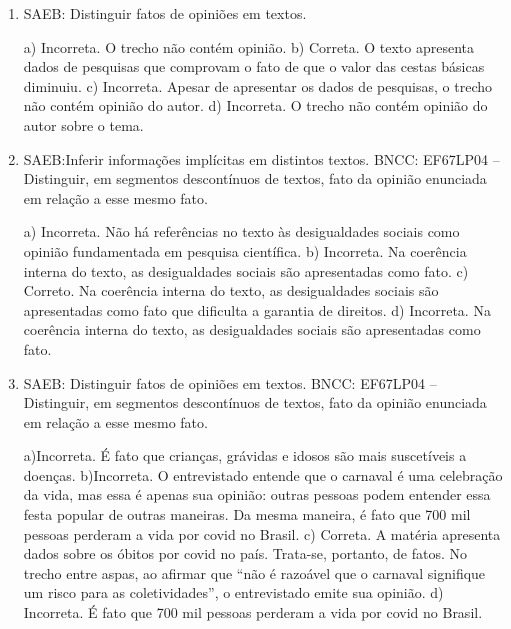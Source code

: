 
\begin{enumerate}

\item
SAEB: Distinguir fatos de opiniões em textos.

a) Incorreta. O trecho não contém opinião. 
b) Correta. O texto apresenta dados de pesquisas que comprovam o fato de
que o valor das cestas básicas diminuiu.
c) Incorreta. Apesar de apresentar os dados de pesquisas, o trecho não
contém opinião do autor.
d) Incorreta. O trecho não contém opinião do autor sobre o tema.

\item
SAEB:Inferir informações implícitas em distintos textos.
BNCC: EF67LP04 -- Distinguir, em segmentos descontínuos de
textos, fato da opinião enunciada em relação a esse mesmo fato.

a) Incorreta. Não há referências no texto às desigualdades sociais como
opinião fundamentada em pesquisa científica.  
b) Incorreta. Na coerência interna do texto, as desigualdades sociais são
apresentadas como fato. 
c) Correto. Na coerência interna do texto, as desigualdades sociais são
apresentadas como fato que dificulta a garantia de direitos.
d) Incorreta. Na coerência interna do texto, as desigualdades sociais são
apresentadas como fato.

\item
SAEB: Distinguir fatos de opiniões em textos.
BNCC: EF67LP04 -- Distinguir, em segmentos descontínuos de textos,
fato da opinião enunciada em relação a esse mesmo fato.

a)Incorreta. É fato que crianças, grávidas e idosos são mais suscetíveis a
doenças. 
b)Incorreta. O entrevistado entende que o carnaval é uma celebração 
da vida, mas essa é apenas sua opinião: outras pessoas podem entender essa
festa popular de outras maneiras. Da mesma maneira, é fato que 700 mil
pessoas perderam a vida por covid no Brasil.  
c) Correta. A matéria apresenta dados sobre os óbitos por covid no
país. Trata-se, portanto, de fatos. No trecho entre aspas, ao afirmar que 
``não é razoável que o carnaval signifique um risco para as coletividades'',
o entrevistado emite sua opinião. 
d) Incorreta. É fato que 700 mil pessoas perderam a vida por covid 
no Brasil.

\end{enumerate}


